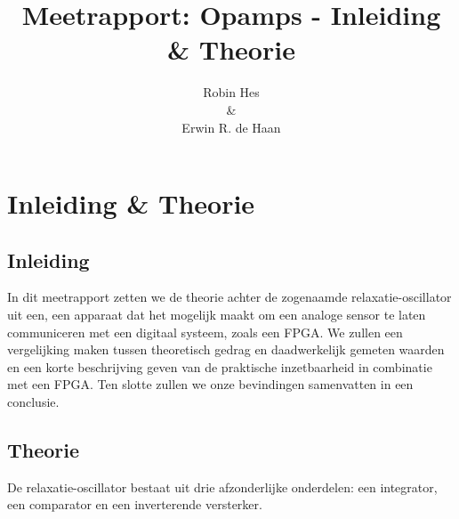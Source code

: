 \documentclass{report}
\title{Meetrapport: Opamps - Inleiding & Theorie}
\author{Robin Hes\\\&\\Erwin R. de Haan}
\begin{document}
\chapter{Inleiding & Theorie}

\section{Inleiding}
In dit meetrapport zetten we de theorie achter de zogenaamde relaxatie-oscillator uit een, een apparaat dat het mogelijk maakt om een analoge sensor te laten communiceren met een digitaal systeem, zoals een FPGA. We zullen een vergelijking maken tussen theoretisch gedrag en daadwerkelijk gemeten waarden en een korte beschrijving geven van de praktische inzetbaarheid in combinatie met een FPGA. Ten slotte zullen we onze bevindingen samenvatten in een conclusie.

\section{Theorie}
De relaxatie-oscillator bestaat uit drie afzonderlijke onderdelen: een integrator, een comparator en een inverterende versterker.
\end{document}
